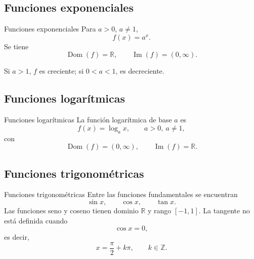 \documentclass[aspectratio=169,10pt]{beamer}
\newcommand{\R}{\mathbb{R}}
\newcommand{\Dom}{\operatorname{Dom}}
\newcommand{\Ima}{\operatorname{Im}}
\begin{document}
\subsection*{Funciones exponenciales}
\begin{frame}{Funciones exponenciales}
Para $a>0$, $a\neq1$,
\[
f(x)=a^x.
\]
Se tiene
\[
\Dom(f)=\R,\qquad \Ima(f)=(0,\infty).
\]

Si $a>1$, $f$ es creciente; si $0<a<1$, es decreciente.
\end{frame}
\subsection*{Funciones logarítmicas}
\begin{frame}{Funciones logarítmicas}
La función logarítmica de base $a$ es
\[
f(x)=\log_a x,
\qquad a>0,\ a\neq1,
\]
con
\[
\Dom(f)=(0,\infty),\qquad\Ima(f)=\R.
\]
\end{frame}
\subsection*{Funciones trigonométricas}
\begin{frame}{Funciones trigonométricas}
Entre las funciones fundamentales se encuentran
\[
\sin x,\qquad\cos x,\qquad\tan x.
\]
Las funciones seno y coseno tienen dominio $\R$ y rango $[-1,1]$. La tangente
no está definida cuando
\[
\cos x=0,
\]
es decir,
\[
x=\frac{\pi}{2}+k\pi,\qquad k\in\mathbb Z.
\]

\end{frame}
\end{document}
